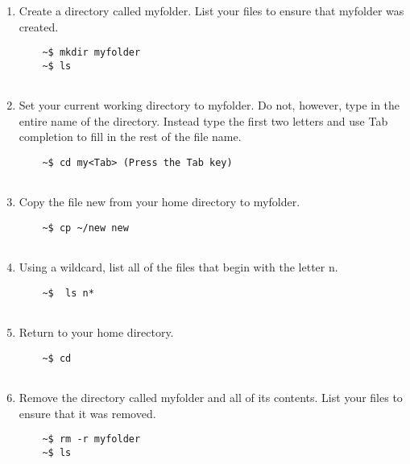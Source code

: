\documentclass[11 pt,USletter,oneside]{article}
\begin{document}
\begin{enumerate}
\begin{enumerate}
\begin{verbatim}
\end{verbatim}
\item Create a directory called myfolder. List your files to ensure that myfolder was created. 
\begin{verbatim}
	~$ mkdir myfolder
	~$ ls
	
\end{verbatim}
\item Set your current working directory to myfolder. Do not, however, type in the entire name of the directory. Instead type the first two letters and use Tab completion to fill in the rest of the file name.

\begin{verbatim}
	~$ cd my<Tab> (Press the Tab key)
	
\end{verbatim}
\item Copy the file new from your home directory to myfolder.
\begin{verbatim}
	~$ cp ~/new new
	
\end{verbatim}
\item Using a wildcard, list all of the files that begin with the letter n.
\begin{verbatim}
	~$  ls n*
	
\end{verbatim}
\item  Return to your home directory.

\begin{verbatim}
	~$ cd
	
\end{verbatim}
\item  Remove the directory called myfolder and all of its contents. List your files to ensure that it was removed.
\begin{verbatim}
	~$ rm -r myfolder
	~$ ls
	
\end{verbatim}
\end{enumerate} 
    
\end{enumerate}        
\vspace{3em}
\end{document}

